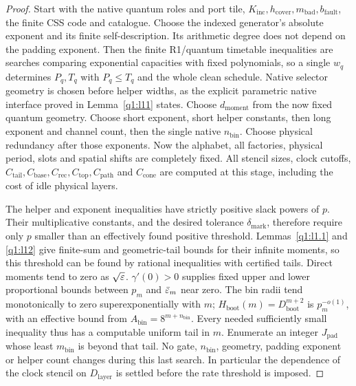 \begin{proof}
Start with the native quantum roles and port tile, \(K_{\mathrm{inc}},h_{\mathrm{cover}},m_{\mathrm{bad}},b_{\mathrm{fault}}\), the finite CSS code and catalogue. Choose the indexed generator's absolute exponent and its finite self-description. Its arithmetic degree does not depend on the padding exponent. Then the finite R1/quantum timetable inequalities are searches comparing exponential capacities with fixed polynomials, so a single \(w_{q}\) determines \(P_{q},T_{q}\) with \(P_{q}\le T_{q}\) and the whole clean schedule. Native selector geometry is chosen before helper widths, as the explicit parametric native interface proved in Lemma~\ref{q1:l11} states. Choose \(d_{\mathrm{moment}}\) from the now fixed quantum geometry. Choose short exponent, short helper constants, then long exponent and channel count, then the single native \(n_{\mathrm{bin}}\). Choose physical redundancy after those exponents. Now the alphabet, all factories, physical period, slots and spatial shifts are completely fixed. All stencil sizes, clock cutoffs, \(C_{\mathrm{tail}},C_{\mathrm{base}},C_{\mathrm{rec}},C_{\mathrm{top}},C_{\mathrm{path}}\) and \(C_{\mathrm{cone}}\) are computed at this stage, including the cost of idle physical layers.

The helper and exponent inequalities have strictly positive slack powers of \(p\). Their multiplicative constants, and the desired tolerance \(\delta_{\mathrm{mark}}\), therefore require only \(p\) smaller than an effectively found positive threshold. Lemmas~\ref{q1:l1.1} and \ref{q1:l12} give finite-sum and geometric-tail bounds for their infinite moments, so this threshold can be found by rational inequalities with certified tails. Direct moments tend to zero as \(\sqrt{\varepsilon}\). \(\gamma'(0)>0\) supplies fixed upper and lower proportional bounds between \(p_{m}\) and \(\bar{\varepsilon}_{m}\) near zero. The bin radii tend monotonically to zero superexponentially with \(m\); \(H_{\mathrm{boot}}(m)=D_{\mathrm{boot}}^{m+2}\) is \(p_{m}^{-o(1)}\), with an effective bound from \(A_{\mathrm{bin}}=8^{m+n_{\mathrm{bin}}}\). Every needed sufficiently small inequality thus has a computable uniform tail in \(m\). Enumerate an integer \(J_{\mathrm{pad}}\) whose least \(m_{\mathrm{bin}}\) is beyond that tail. No gate, \(n_{\mathrm{bin}}\), geometry, padding exponent or helper count changes during this last search. In particular the dependence of the clock stencil on \(D_{\mathrm{layer}}\) is settled before the rate threshold is imposed.


\end{proof}
